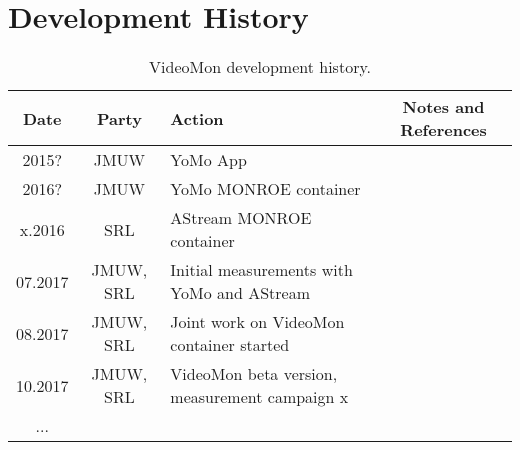 
\section{Development History}\label{sec:developmenthistory}

\begin{table}[h!]
\centering
\caption{VideoMon development history.}
\begin{tabular}{|c|c|l|c|}
\hline
\textbf{Date} & \textbf{Party} & \textbf{Action} & \textbf{Notes and References} \\
\hline
2015? & \ac{JMUW} & YoMo App & \\
\hline
2016? & \ac{JMUW} & YoMo MONROE container & \\
\hline
x.2016 & \ac{SRL} & AStream MONROE container &\\
\hline
07.2017 & \ac{JMUW}, \ac{SRL} & Initial measurements with YoMo and AStream & \\  
\hline
08.2017 & \ac{JMUW}, \ac{SRL} & Joint work on VideoMon container started & \\  
\hline
10.2017 & \ac{JMUW}, \ac{SRL} & VideoMon beta version, measurement campaign x &\\
\hline
... & & & \\
\hline
\end{tabular}
\label{tab:relatedwork}
\end{table}